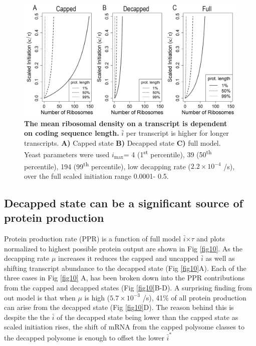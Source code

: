 \documentclass[10pt,letterpaper]{article}
\newcommand{\imax}{\ensuremath{{i_{\max}}}\xspace}
\newcommand{\MRL}{\ensuremath{\bar{i}}\xspace}
\begin{document}
\begin{figure}[!h]
\begin{center}
\includegraphics[width=120mm]{Images/MRL.png}
\caption{{\bf The mean ribosomal density on a transcript is dependent on coding sequence length.} 
\MRL per transcript is higher for longer transcripts. {\bf A)} Capped state {\bf B)} Decapped state {\bf C)} full model. Yeast parameters were used \imax =  4 (1\textsuperscript{st} percentile),  39 (50\textsuperscript{th} percentile), 194 (99\textsuperscript{th} percentile), low decapping rate ($2.2\times 10^{-4}$ /s), over the full scaled initiation range 0.0001- 0.5.}
\label{fig9}
\end{center}
\end{figure}

\subsection*{Decapped state can be a significant source of protein production} 
Protein production rate (PPR) is a function of full model \MRL $\times \tau$ and plots normalized to highest possible protein output are shown in Fig \ref{fig10}.
As the decapping rate $\mu$ increases it reduces the capped and uncapped \MRL as well as shifting transcript abundance to the decapped state (Fig \ref{fig10}A).
Each of the three cases in Fig \ref{fig10} A, has been broken down into the PPR contributions from the capped and decapped states (Fig \ref{fig10}B-D). 
A surprising finding from out model is that when $\mu$ is high ($5.7\times 10^{-3}$ /s), 41\% of all protein production can arise from the decapped state (Fig \ref{fig10}D).
The reason behind this is despite the the \MRL of the decapped state being lower than the capped state as scaled initiation rises, the shift of mRNA from the capped polysome classes to the decapped polysome is enough to offset the lower $\MRL^*$
\end{document}
